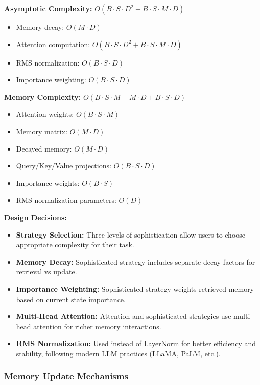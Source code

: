 \documentclass{article}
\begin{document}
\begin{enumerate}
\textbf{Asymptotic Complexity:} $O(B \cdot S \cdot D^2 + B \cdot S \cdot M \cdot D)$
\begin{itemize}
\item Memory decay: $O(M \cdot D)$
\item Attention computation: $O(B \cdot S \cdot D^2 + B \cdot S \cdot M \cdot D)$
\item RMS normalization: $O(B \cdot S \cdot D)$
\item Importance weighting: $O(B \cdot S \cdot D)$
\end{itemize}

\textbf{Memory Complexity:} $O(B \cdot S \cdot M + M \cdot D + B \cdot S \cdot D)$
\begin{itemize}
\item Attention weights: $O(B \cdot S \cdot M)$
\item Memory matrix: $O(M \cdot D)$
\item Decayed memory: $O(M \cdot D)$
\item Query/Key/Value projections: $O(B \cdot S \cdot D)$
\item Importance weights: $O(B \cdot S)$
\item RMS normalization parameters: $O(D)$
\end{itemize}
\end{enumerate}

\textbf{Design Decisions:} 
\begin{itemize}
\item \textbf{Strategy Selection:} Three levels of sophistication allow users to choose appropriate complexity for their task.
\item \textbf{Memory Decay:} Sophisticated strategy includes separate decay factors for retrieval vs update.
\item \textbf{Importance Weighting:} Sophisticated strategy weights retrieved memory based on current state importance.
\item \textbf{Multi-Head Attention:} Attention and sophisticated strategies use multi-head attention for richer memory interactions.
\item \textbf{RMS Normalization:} Used instead of LayerNorm for better efficiency and stability, following modern LLM practices (LLaMA, PaLM, etc.).
\end{itemize}

\subsubsection{Memory Update Mechanisms}
\end{document}
